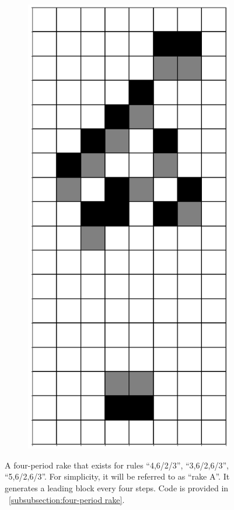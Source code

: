 \documentclass[12pt]{article}
\numberwithin{figure}{section} %
\begin{document}
\begin{figure}[H]
\begin{subfigure}{0.19\textwidth}
     \subcaption{}
   \end{subfigure}
           \begin{subfigure}{0.19\textwidth}
     \centering
     \includegraphics[width=\linewidth]{Section4/27.4}
     \subcaption{}
   \end{subfigure}
   \setcounter{subfigure}{0}
\caption[A four-period rake]{A four-period rake that exists for rules “4,6/2/3”, “3,6/2,6/3”, “5,6/2,6/3”. For simplicity, it will be referred to as “rake A”. It generates a leading block every four steps. Code is provided in ~\ref{subsubsection:four-period rake}. }
\label{fig:four-period rake}
\vspace{-1.5em}
\end{figure}
\end{document}
